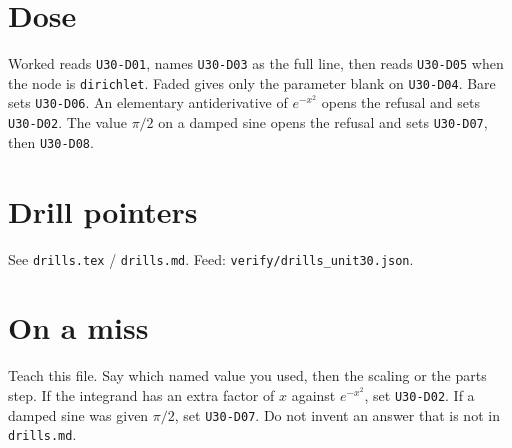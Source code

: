 \section{Dose}
Worked reads \texttt{U30-D01}, names \texttt{U30-D03} as the full line, then reads \texttt{U30-D05} when the node is \texttt{dirichlet}. Faded gives only the parameter blank on \texttt{U30-D04}. Bare sets \texttt{U30-D06}. An elementary antiderivative of $e^{-x^2}$ opens the refusal and sets \texttt{U30-D02}. The value $\pi/2$ on a damped sine opens the refusal and sets \texttt{U30-D07}, then \texttt{U30-D08}.

\section{Drill pointers}
See \texttt{drills.tex} / \texttt{drills.md}. Feed: \texttt{verify/drills\_unit30.json}.

\section*{On a miss}
Teach this file. Say which named value you used, then the scaling or the parts step. If the integrand has an extra factor of $x$ against $e^{-x^2}$, set \texttt{U30-D02}. If a damped sine was given $\pi/2$, set \texttt{U30-D07}. Do not invent an answer that is not in \texttt{drills.md}.

